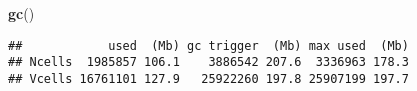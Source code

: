 \documentclass[11pt,]{article}
\newenvironment{Shaded}{\begin{snugshade}}{\end{snugshade}}
\newcommand{\KeywordTok}[1]{\textcolor[rgb]{0.13,0.29,0.53}{\textbf{#1}}}
\newcommand{\NormalTok}[1]{#1}
\begin{document}
\begin{Shaded}
\begin{Highlighting}[]
\KeywordTok{gc}\NormalTok{()}
\end{Highlighting}
\end{Shaded}

\begin{verbatim}
##            used  (Mb) gc trigger  (Mb) max used  (Mb)
## Ncells  1985857 106.1    3886542 207.6  3336963 178.3
## Vcells 16761101 127.9   25922260 197.8 25907199 197.7
\end{verbatim}




\newpage
\singlespacing 
\end{document}
